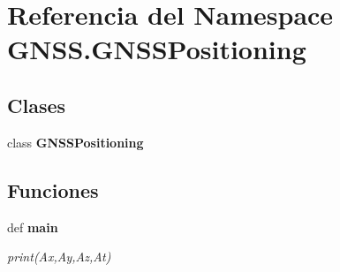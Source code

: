 \section{Referencia del Namespace G\-N\-S\-S.\-G\-N\-S\-S\-Positioning}
\label{namespaceGNSS_1_1GNSSPositioning}
\subsection*{Clases}
\begin{DoxyCompactItemize}
\item 
class {\bf G\-N\-S\-S\-Positioning}
\end{DoxyCompactItemize}
\subsection*{Funciones}
\begin{DoxyCompactItemize}
\item 
def {\bf main}
\begin{DoxyCompactList}\small\item\em print(\-Ax,\-Ay,\-Az,\-At) \end{DoxyCompactList}\end{DoxyCompactItemize}
